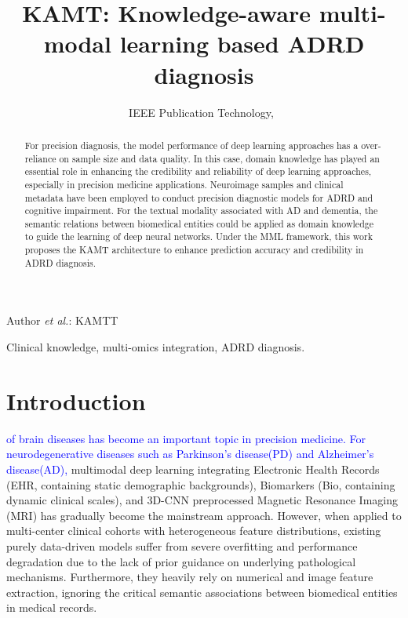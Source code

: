 \documentclass[lettersize,journal]{IEEEtran}
\begin{document}
\title{KAMT: Knowledge-aware multi-modal learning based ADRD diagnosis}

\author{IEEE Publication Technology,~
        
}

%
{Author \MakeLowercase{\textit{et al.}}: KAMTT}



\maketitle

\begin{abstract}
        For precision diagnosis, the model performance of deep learning approaches has a over-reliance on sample size and data quality.
        In this case, domain knowledge has played an essential role in enhancing the credibility and reliability of deep learning approaches, especially in precision medicine applications. Neuroimage samples and clinical metadata have been employed to conduct precision diagnostic models for ADRD and cognitive impairment. For the textual modality associated with AD and dementia, the semantic relations between biomedical entities could be applied as domain knowledge to guide the learning of deep neural networks. Under the MML framework, this work proposes the KAMT architecture to enhance prediction accuracy and credibility in ADRD diagnosis.   
        
\end{abstract}

\begin{IEEEkeywords}
	Clinical knowledge, multi-omics integration, ADRD diagnosis.
\end{IEEEkeywords}

\section{Introduction}
\label{sec:introduction}

    \textcolor{blue}{ of brain diseases has become an important topic in precision medicine. For neurodegenerative diseases such as Parkinson's disease(PD) and Alzheimer's disease(AD),} multimodal deep learning integrating Electronic Health Records (EHR, containing static demographic backgrounds), Biomarkers (Bio, containing dynamic clinical scales), and 3D-CNN preprocessed Magnetic Resonance Imaging (MRI) has gradually become the mainstream approach. However, when applied to multi-center clinical cohorts with heterogeneous feature distributions, existing purely data-driven models suffer from severe overfitting and performance degradation due to the lack of prior guidance on underlying pathological mechanisms. Furthermore, they heavily rely on numerical and image feature extraction, ignoring the critical semantic associations between biomedical entities in medical records.
\end{document}
